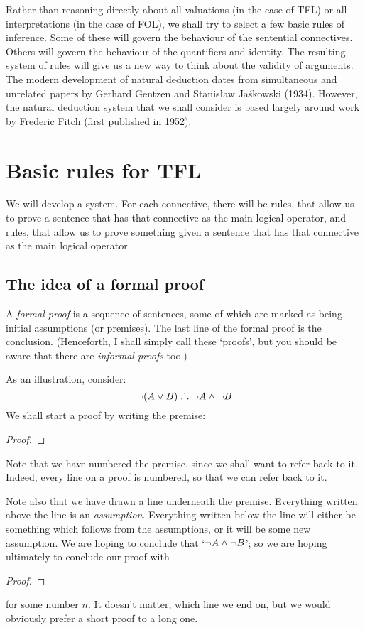 Rather than reasoning directly about all valuations (in the case of TFL) or all interpretations (in the case of FOL), we shall try to select a few basic rules of inference. Some of these will govern the behaviour of the sentential connectives. Others will govern the behaviour of the quantifiers and identity. The resulting system of rules will give us a new way to think about the validity of arguments. 
The modern development of natural deduction dates from simultaneous and unrelated papers by Gerhard Gentzen and Stanis\l{}aw Ja\'{s}kowski (1934). However, the natural deduction system that we shall consider is based largely around work by Frederic Fitch (first published in 1952). 



\chapter{Basic rules for TFL}\label{s:BasicTFL}
We will develop a  system. For each connective, there will be  rules, that allow us to prove a sentence that has that connective as the main logical operator, and  rules, that allow us to prove something given a sentence that has that connective as the main logical operator

\section{The idea of a formal proof}
A \emph{formal proof} is a sequence of sentences, some of which are marked as being initial assumptions (or premises). The last line of the formal proof is the conclusion. (Henceforth, I shall simply call these `proofs', but you should be aware that there are \emph{informal proofs} too.)

As an illustration, consider:
	$$\neg (A \vee B) \mathrel{\ldotp\dot{}\,\ldotp} \neg A \wedge \neg B$$
We shall start a proof by writing the premise:
\begin{proof}
\end{proof}
Note that we have numbered the premise, since we shall want to refer back to it. Indeed, every line on a proof is numbered, so that we can refer back to it. 

Note also that we have drawn a line underneath the premise. Everything written above the line is an \emph{assumption}. Everything written below the line will either be something which follows from the assumptions, or it will be some new assumption. We are hoping to conclude that `$\neg A \wedge \neg B$'; so we are hoping ultimately to conclude our proof with
\begin{proof}
\end{proof}
for some number $n$. It doesn't matter, which line we end on, but we would obviously prefer a short proof to a long one.

